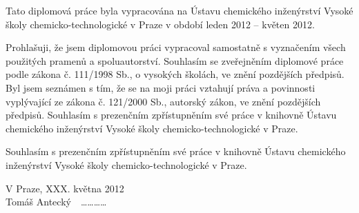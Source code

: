 Tato diplomová práce byla vypracována na Ústavu chemického inženýrství Vysoké školy chemicko-technologické v Praze v období leden 2012 -- květen 2012.


\vspace{16cm}
Prohlašuji, že jsem diplomovou práci vypracoval samostatně s vyznačením všech použitých pramenů a spoluautorství. Souhlasím se zveřejněním diplomové práce podle zákona č. 111/1998 Sb., o vysokých školách, ve znění pozdějších předpisů. Byl jsem seznámen s tím, že se na moji práci vztahují práva a povinnosti vyplývající ze zákona č. 121/2000 Sb., autorský zákon, ve znění pozdějších předpisů. Souhlasím s prezenčním zpřístupněním své práce v knihovně Ústavu chemického inženýrství Vysoké školy chemicko-technologické v Praze.

Souhlasím s prezenčním zpřístupněním své práce v knihovně Ústavu chemického inženýrství Vysoké školy chemicko-technologické v Praze.

\vspace{1cm}
\noindent
V Praze, XXX. května 2012\\

\hfill Tomáš Antecký \,\, \ldots\ldots\ldots\ldots
